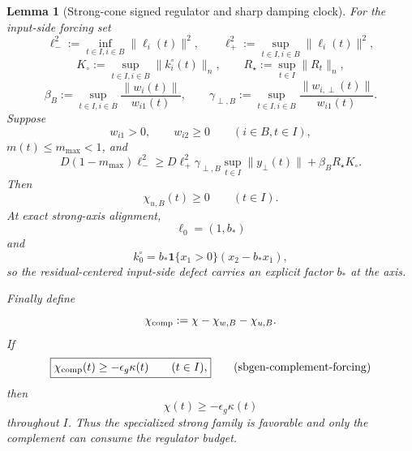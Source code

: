 \documentclass{article} %
\theoremstyle{plain}
\newtheorem{lemma}[theorem]{Lemma}
\theoremstyle{definition}
\theoremstyle{remark}
\begin{document}
\begin{lemma}[Strong-cone signed regulator and sharp damping clock]
For the input-side forcing set
\[
\ell_-^2
:=
\inf_{t\in I,i\in B}\|\ell_i(t)\|^2,
\qquad
\ell_+^2
:=
\sup_{t\in I,i\in B}\|\ell_i(t)\|^2,
\]
\[
K_\circ
:=
\sup_{t\in I,i\in B}\|k_i^\circ(t)\|_n,
\qquad
R_\star:=\sup_{t\in I}\|R_t\|_n,
\]
\[
\beta_B
:=
\sup_{t\in I,i\in B}
\frac{\|w_i(t)\|}{w_{i1}(t)},
\qquad
\gamma_{\perp,B}
:=
\sup_{t\in I,i\in B}
\frac{\|w_{i,\perp}(t)\|}{w_{i1}(t)}.
\]
Suppose
\[
w_{i1}>0,
\qquad
w_{i2}\ge0
\qquad(i\in B,t\in I),
\]
$m(t)\le m_{\max}<1$, and
\[
\boxed{
D(1-m_{\max})\ell_-^2
\ge
D\ell_+^2\gamma_{\perp,B}
\sup_{t\in I}\|y_\perp(t)\|
+
\beta_BR_\star K_\circ.
}
\tag{sbgen-u-positive-condition}\label{sbgen:u-positive-condition}
\]
Then
\[
\boxed{\chi_{u,B}(t)\ge0\qquad(t\in I).}
\tag{sbgen-chi-u-positive}\label{sbgen:chi-u-positive}
\]
At exact strong-axis alignment,
\[
\ell_0=(1,b_*)
\]
and
\[
\boxed{
k_0^\circ
=
b_*\mathbf1\{x_1>0\}(x_2-b_*x_1),
}
\tag{sbgen-kcirc-axis}\label{sbgen:kcirc-axis}
\]
so the residual-centered input-side defect carries an explicit factor $b_*$
at the axis.

Finally define
\[
\chi_{\rm comp}
:=
\chi-\chi_{w,B}-\chi_{u,B}.
\]
If
\[
\boxed{
\chi_{\rm comp}(t)\ge-\epsilon_g\kappa(t)
\qquad(t\in I),
}
\tag{sbgen-complement-forcing}\label{sbgen:complement-forcing}
\]
then
\[
\boxed{\chi(t)\ge-\epsilon_g\kappa(t)}
\tag{sbgen-total-forcing}\label{sbgen:total-forcing}
\]
throughout $I$.  Thus the specialized strong family is favorable and only
the complement can consume the regulator budget.
\end{lemma}
\end{document}
